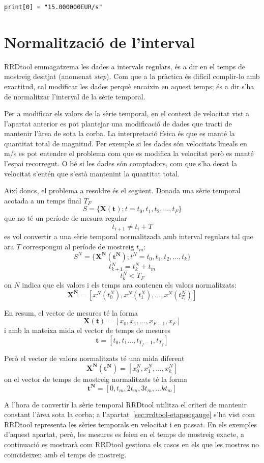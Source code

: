 \begin{lstlisting}
print[0] = "15.000000EUR/s"
\end{lstlisting}

\section[Normalització]{Normalització de l'interval}
\label{sec:rrdtool-etapes:normalitzacio}

RRDtool emmagatzema les dades a intervals regulars, és a dir en el temps de mostreig desitjat (anomenat \emph{step}). Com que a la pràctica és difícil complir-lo amb exactitud, cal modificar les dades perquè encaixin en aquest temps; és a dir s'ha de normalitzar l'interval de la sèrie temporal.

Per a modificar els valors de la sèrie temporal, en el context de velocitat vist a l'apartat anterior es pot plantejar una modificació de dades que tracti de mantenir l'àrea de sota la corba. La interpretació física és que es manté la quantitat total de magnitud.
Per exemple si les dades són velocitats lineals en m/s es pot entendre el problema com que es modifica la velocitat però es manté l'espai recorregut. O bé si les dades són comptadors, com que s'ha desat la velocitat s'entén que s'està mantenint la quantitat total.

Així doncs, el problema a resoldre és el següent. Donada una sèrie temporal acotada a un temps final $T_F$
$$%
S=\{\mathbf{X(t)}; t=t_0,t_1,t_2,\ldots,t_F\}
$$
que no té un període de mesura regular 
$$
t_{i+1}\neq t_{i} + T 
$$
es vol convertir a una sèrie temporal normalitzada amb interval regulars tal que ara $T$ correspongui al període de mostreig $t_m$:
$$%
S^N=\{\mathbf{X^N(t^N)}; t^N=t_0,t_1,t_2,\ldots,t_k\}
$$
$$
t^N_{k+1}= t^N_{k} + t_m 
$$
$$
t^N_k < T_F
$$
on $N$ indica que els valors i els temps ara contenen els valors normalitzats:
$$
\mathbf{X^N}= [x^N(t^N_0),x^N(t^N_1),\ldots,x^N(t^N_{T_i})]
$$

En resum, el vector de mesures té la forma 
$$
\mathbf{X(t)} = [x_0,x_1,\ldots,x_{F-1},x_F]
$$
i amb la mateixa mida el vector de temps de mesures
$$
\mathbf{t}=[t_0,t_1 \ldots, t_{T_f-1}, t_{T_f} ]
$$

Però el vector de valors normalitzats té una mida diferent 
$$
\mathbf{X^N(t^N)} = [x^N_0, x^N_1, \ldots,x^N_k ]
$$
on el vector de temps de mostreig normalitzats té la forma
$$
\mathbf{t^N}=[0,t_m, 2t_m,3t_m, \ldots kt_m ]
$$


A l'hora de convertir la sèrie temporal RRDtool utilitza el criteri de mantenir constant l'àrea sota la corba; a l'apartat~\ref{sec:rrdtool-etapes:gauge} s'ha vist com RRDtool representa les sèries temporals en velocitat i en passat. En els exemples d'aquest apartat, però, les mesures es feien en el temps de mostreig exacte, a continuació es mostrarà com RRDtool gestiona els casos en els que les mostres no coincideixen amb el temps de mostreig.

